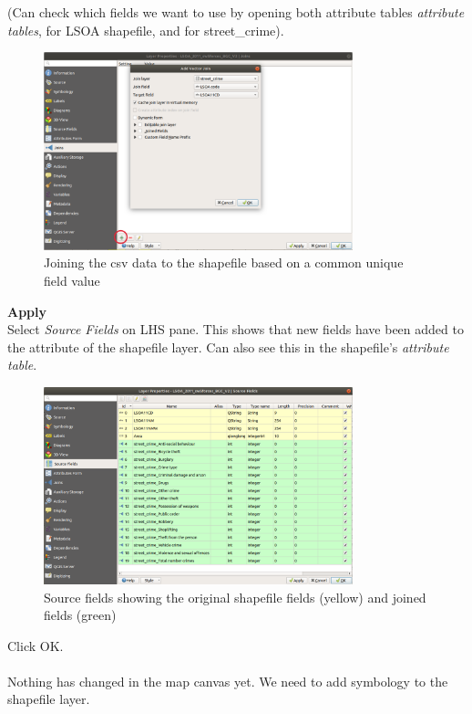 (Can check which fields we want to use by opening both attribute tables \textit{attribute tables}, for LSOA shapefile, and for street\_crime).

\begin{figure}[!h]
	\centering
	\includegraphics[width=0.8\textwidth]{images/layer_properties_join.png}
	\caption{Joining the csv data to the shapefile based on a common unique field value}
	\label{ft_fig_firstfig3}
\end{figure}

\textbf{Apply}\\

Select \textit{Source Fields} on LHS pane. This shows that new fields have been added to the attribute of the shapefile layer. Can also see this in the shapefile’s \textit{attribute table}. 

\null\newpage

\begin{figure}[!h]
	\centering
	\includegraphics[width=0.8\textwidth]{images/layer_properties_source_fields.png}
	\caption{Source fields showing the original shapefile fields (yellow) and joined fields (green)}
	\label{ft_fig_firstfig3}
\end{figure}

Click OK.\\
\\
Nothing has changed in the map canvas yet. We need to add symbology to the shapefile layer.